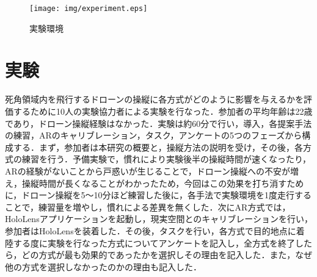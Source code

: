 \documentclass
[a4paper,11pt]{jreport}
\begin{document}
\begin{figure}[bt]
	\begin{center}
    \texttt{[image: img/experiment.eps]}
    \caption{実験環境}
    \label{tab:experiment}
    \end{center}
\end{figure}



\section{実験}
死角領域内を飛行するドローンの操縦に各方式がどのように影響を与えるかを評価するために10人の実験協力者による実験を行なった．参加者の平均年齢は22歳であり，ドローン操縦経験はなかった．実験は約60分で行い，導入，各提案手法の練習，ARのキャリブレーション，タスク，アンケートの5つのフェーズから構成する．まず，参加者は本研究の概要と，操縦方法の説明を受け，その後，各方式の練習を行う．予備実験で，慣れにより実験後半の操縦時間が速くなったり，ARの経験がないことから戸惑いが生じることで，ドローン操縦への不安が増え，操縦時間が長くなることがわかったため，今回はこの効果を打ち消すために，ドローン操縦を5〜10分ほど練習した後に，各手法で実験環境を1度走行することで，練習量を増やし，慣れによる差異を無くした．次にAR方式では，HoloLensアプリケーションを起動し，現実空間とのキャリブレーションを行い，参加者はHoloLensを装着した．その後，タスクを行い，各方式で目的地点に着陸する度に実験を行なった方式についてアンケートを記入し，全方式を終了したら，どの方式が最も効果的であったかを選択しその理由を記入した．また，なぜ他の方式を選択しなかったのかの理由も記入した．


\end{document}
